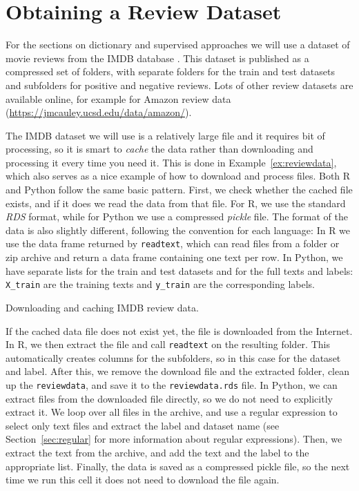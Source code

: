 %

\section{Obtaining a Review Dataset}
\label{sec:reviewdataset}

For the sections on dictionary and supervised approaches we will use a dataset of movie reviews
from the IMDB database \citep{aclimdb}.
This dataset is published as a compressed set of folders, with separate folders for the train and test datasets and subfolders for positive and negative reviews.
Lots of other review datasets are available online, for example for Amazon review data (\url{https://jmcauley.ucsd.edu/data/amazon/}).

The IMDB dataset we will use is a relatively large file and it requires bit of processing,
so it is smart to \emph{cache} the data rather than downloading and processing it every time you need it.
This is done in Example~\ref{ex:reviewdata}, which also serves as a nice example of how to download and process files.
Both R and Python follow the same basic pattern.
First, we check whether the cached file exists, and if it does we read the data from that file.
For R, we use the standard \emph{RDS} format, while for Python we use a compressed \emph{pickle} file.
The format of the data is also slightly different, following the convention for each language:
In R we use the data frame returned by \texttt{readtext},
which can read files from a folder or zip archive and return a data frame containing one text per row.
In Python, we have separate lists for the train and test datasets and for the full texts and labels:
\texttt{\small{X\_train}} are the training texts and \texttt{\small{y\_train}} are the corresponding labels.

\begin{ccsexample}
  \caption{Downloading and caching IMDB review data.}\label{ex:reviewdata}
\end{ccsexample}

If the cached data file does not exist yet,
the file is downloaded from the Internet.
In R, we then extract the file and call \texttt{readtext} on the resulting folder.
This automatically creates columns for the subfolders, so in this case for the dataset and label.
After this, we remove the download file and the extracted folder,
clean up the \texttt{\small{reviewdata}}, and save it to the \texttt{\small{reviewdata.rds}} file.
In Python, we can extract files from the downloaded file directly,
so we do not need to explicitly extract it.
We loop over all files in the archive, and use a regular expression to
select only text files and extract the label and dataset name
(see Section~\ref{sec:regular} for more information about regular expressions).
Then, we extract the text from the archive, and add the text and the label to the appropriate list.
Finally, the data is saved as a compressed pickle file,
so the next time we run this cell it does not need to download the file again.



